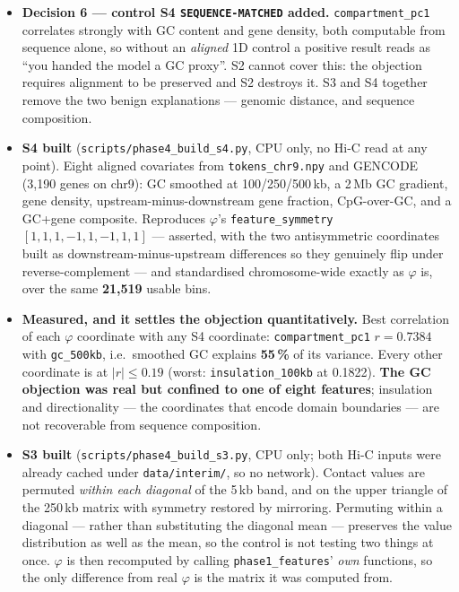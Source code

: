 \documentclass[11pt,a4paper]{article}
\newcommand{\code}[1]{\texttt{\small #1}}
\begin{document}
\begin{itemize}
\item \textbf{Decision 6 --- control S4 \code{SEQUENCE-MATCHED} added.}
\code{compartment\_pc1} correlates strongly with GC content and gene density,
both computable from sequence alone, so without an \emph{aligned} 1D control a
positive result reads as ``you handed the model a GC proxy''. S2 cannot cover
this: the objection requires alignment to be preserved and S2 destroys it. S3 and
S4 together remove the two benign explanations --- genomic distance, and sequence
composition.

\item \textbf{S4 built} (\code{scripts/phase4\_build\_s4.py}, CPU only, no Hi-C
read at any point). Eight aligned covariates from \code{tokens\_chr9.npy} and
GENCODE (3{,}190 genes on chr9): GC smoothed at 100/250/500\,kb, a 2\,Mb GC
gradient, gene density, upstream-minus-downstream gene fraction, CpG-over-GC, and
a GC+gene composite. Reproduces $\varphi$'s \code{feature\_symmetry}
$[1,1,1,-1,1,-1,1,1]$ --- asserted, with the two antisymmetric coordinates built
as downstream-minus-upstream differences so they genuinely flip under
reverse-complement --- and standardised chromosome-wide exactly as $\varphi$ is,
over the same \textbf{21{,}519} usable bins.

\item \textbf{Measured, and it settles the objection quantitatively.} Best
correlation of each $\varphi$ coordinate with any S4 coordinate:
\code{compartment\_pc1} $r = \mathbf{0.7384}$ with \code{gc\_500kb}, i.e.\
smoothed GC explains \textbf{55\,\%} of its variance. Every other coordinate is
at $|r| \le 0.19$ (worst: \code{insulation\_100kb} at 0.1822). \textbf{The GC
objection was real but confined to one of eight features}; insulation and
directionality --- the coordinates that encode domain boundaries --- are not
recoverable from sequence composition.

\item \textbf{S3 built} (\code{scripts/phase4\_build\_s3.py}, CPU only; both Hi-C
inputs were already cached under \code{data/interim/}, so no network). Contact
values are permuted \emph{within each diagonal} of the 5\,kb band, and on the
upper triangle of the 250\,kb matrix with symmetry restored by mirroring.
Permuting within a diagonal --- rather than substituting the diagonal mean ---
preserves the value distribution as well as the mean, so the control is not
testing two things at once. $\varphi$ is then recomputed by calling
\code{phase1\_features}' \emph{own} functions, so the only difference from real
$\varphi$ is the matrix it was computed from.


\end{itemize}
\end{document}
